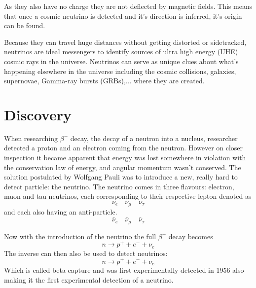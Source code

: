 \documentclass[11pt,a4paper,faculty=we,language=en,doctype=report]{cls/ugent-doc}
\begin{document}
As they also have no charge they are not deflected by magnetic fields. This means
that once a cosmic neutrino is detected and it's direction is inferred, it's origin
can be found.

Because they can travel huge distances without getting distorted or
sidetracked, neutrinos are ideal messengers to identify sources of ultra high
energy (UHE) cosmic rays in the universe.  Neutrinos can serve as unique clues
about what’s happening elsewhere in the universe including the cosmic
collisions, galaxies, supernovae, Gamma-ray bursts (GRBs),... where they are created.

\section{Discovery}
When researching $\beta^-$ decay, the decay of a neutron into a nucleus, researcher
detected a proton and an electron coming from the neutron. However
on closer inspection it became apparent that energy was lost
somewhere in violation with the conservation law of energy, and
angular momentum wasn't conserved.  The solution postulated by
Wolfgang Pauli was to introduce a new, really hard to detect
particle: the neutrino.  The neutrino comes in three flavours:
electron, muon and tau neutrinos, each corresponding to their respective lepton denoted as
\begin{equation}
	\nu_e \quad \nu_\mu \quad \nu_\tau
\end{equation}
and each also having an anti-particle.
\begin{equation}
	\bar{\nu}_e \quad \bar{\nu}_\mu \quad \bar{\nu}_\tau
\end{equation}

Now with the introduction of the neutrino the full $\beta^-$ decay
becomes
\begin{equation}
	n \rightarrow p^+ + e^- + \nu_e
\end{equation}
The inverse can then also be used to detect neutrinos:
\begin{equation}
	n \rightarrow p^+ + e^- + \nu_e
\end{equation}
Which is called beta capture and was first experimentally detected in 1956
\cite{BetaCapture} also making it the first experimental detection of a
neutrino.
\end{document}
